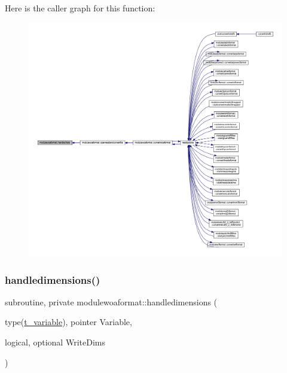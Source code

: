 Here is the caller graph for this function\+:\nopagebreak
\begin{figure}[H]
\begin{center}
\leavevmode
\includegraphics[width=350pt]{namespacemodulewoaformat_a30b457447914696134f34e0ad5f8a6e0_icgraph}
\end{center}
\end{figure}
\mbox{\label{namespacemodulewoaformat_a1755d2188a0690fff10f808cf9ecec9a}} 
\subsubsection{\texorpdfstring{handledimensions()}{handledimensions()}}
{\footnotesize\ttfamily subroutine, private modulewoaformat\+::handledimensions (\begin{DoxyParamCaption}\item[{type(\mbox{\hyperlink{structmodulewoaformat_1_1t__variable}{t\+\_\+variable}}), pointer}]{Variable,  }\item[{logical, optional}]{Write\+Dims }\end{DoxyParamCaption})\hspace{0.3cm}{\ttfamily [private]}}

